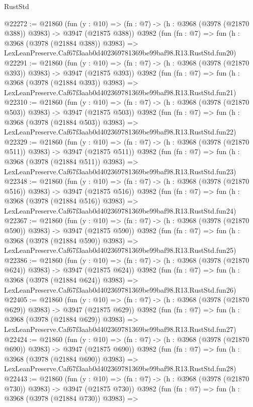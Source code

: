\begin{lexlean}{RustStd}
\begin{coremodule}
@22272 := @21860
    (fun (y : @10) => (fn : @7) -> (h : @3968 (@3978 (@21870 @388)) @3983) -> @3947 (@21875 @388))
    @3982
    (fun (fn : @7) =>
    fun (h : @3968 (@3978 (@21884 @388)) @3983) =>
    LexLeanPreserve.Caf67f3aab0d402369781369be99baf98.R13.RustStd.fun20)
@22291 := @21860
    (fun (y : @10) => (fn : @7) -> (h : @3968 (@3978 (@21870 @393)) @3983) -> @3947 (@21875 @393))
    @3982
    (fun (fn : @7) =>
    fun (h : @3968 (@3978 (@21884 @393)) @3983) =>
    LexLeanPreserve.Caf67f3aab0d402369781369be99baf98.R13.RustStd.fun21)
@22310 := @21860
    (fun (y : @10) => (fn : @7) -> (h : @3968 (@3978 (@21870 @503)) @3983) -> @3947 (@21875 @503))
    @3982
    (fun (fn : @7) =>
    fun (h : @3968 (@3978 (@21884 @503)) @3983) =>
    LexLeanPreserve.Caf67f3aab0d402369781369be99baf98.R13.RustStd.fun22)
@22329 := @21860
    (fun (y : @10) => (fn : @7) -> (h : @3968 (@3978 (@21870 @511)) @3983) -> @3947 (@21875 @511))
    @3982
    (fun (fn : @7) =>
    fun (h : @3968 (@3978 (@21884 @511)) @3983) =>
    LexLeanPreserve.Caf67f3aab0d402369781369be99baf98.R13.RustStd.fun23)
@22348 := @21860
    (fun (y : @10) => (fn : @7) -> (h : @3968 (@3978 (@21870 @516)) @3983) -> @3947 (@21875 @516))
    @3982
    (fun (fn : @7) =>
    fun (h : @3968 (@3978 (@21884 @516)) @3983) =>
    LexLeanPreserve.Caf67f3aab0d402369781369be99baf98.R13.RustStd.fun24)
@22367 := @21860
    (fun (y : @10) => (fn : @7) -> (h : @3968 (@3978 (@21870 @590)) @3983) -> @3947 (@21875 @590))
    @3982
    (fun (fn : @7) =>
    fun (h : @3968 (@3978 (@21884 @590)) @3983) =>
    LexLeanPreserve.Caf67f3aab0d402369781369be99baf98.R13.RustStd.fun25)
@22386 := @21860
    (fun (y : @10) => (fn : @7) -> (h : @3968 (@3978 (@21870 @624)) @3983) -> @3947 (@21875 @624))
    @3982
    (fun (fn : @7) =>
    fun (h : @3968 (@3978 (@21884 @624)) @3983) =>
    LexLeanPreserve.Caf67f3aab0d402369781369be99baf98.R13.RustStd.fun26)
@22405 := @21860
    (fun (y : @10) => (fn : @7) -> (h : @3968 (@3978 (@21870 @629)) @3983) -> @3947 (@21875 @629))
    @3982
    (fun (fn : @7) =>
    fun (h : @3968 (@3978 (@21884 @629)) @3983) =>
    LexLeanPreserve.Caf67f3aab0d402369781369be99baf98.R13.RustStd.fun27)
@22424 := @21860
    (fun (y : @10) => (fn : @7) -> (h : @3968 (@3978 (@21870 @690)) @3983) -> @3947 (@21875 @690))
    @3982
    (fun (fn : @7) =>
    fun (h : @3968 (@3978 (@21884 @690)) @3983) =>
    LexLeanPreserve.Caf67f3aab0d402369781369be99baf98.R13.RustStd.fun28)
@22443 := @21860
    (fun (y : @10) => (fn : @7) -> (h : @3968 (@3978 (@21870 @730)) @3983) -> @3947 (@21875 @730))
    @3982
    (fun (fn : @7) =>
    fun (h : @3968 (@3978 (@21884 @730)) @3983) =>

\end{coremodule}
\end{lexlean}

